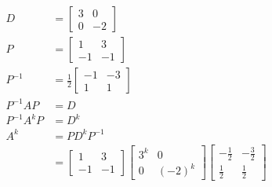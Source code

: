 \documentclass{math}
\begin{document}
\begin{align*}
  D &= \begin{bmatrix}3 & 0 \\ 0 & -2\end{bmatrix} \\
  P &= \begin{bmatrix}1 & 3 \\ -1 & -1\end{bmatrix} \\
  P^{-1} &= \frac{1}{2}\begin{bmatrix}-1 & -3 \\ 1 & 1\end{bmatrix} \\
  P^{-1}AP &= D \\
  P^{-1}A^kP &= D^k \\
  A^k &= PD^kP^{-1} \\
  &= \begin{bmatrix}1 & 3 \\ -1 & -1\end{bmatrix}
    \begin{bmatrix}3^k & 0 \\ 0 & (-2)^k\end{bmatrix}
    \begin{bmatrix}
      -\frac{1}{2} & -\frac{3}{2} \\
      \frac{1}{2} & \frac{1}{2}
    \end{bmatrix}
\end{align*}
\end{document}
